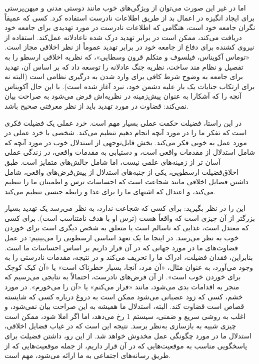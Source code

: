 اما در غیر این صورت می‌توان از ویژگی‌های خوب مانند دوستی مدنی و میهن‌پرستی برای ایجاد انگیزه در اعمال بد از طریق اطلاعات نادرست استفاده کرد.
کسی که عمیقاً نگران جامعه خود است، هنگامی که اطلاعات نادرست در مورد تهدیدی برای جامعه خود دریافت می‌کند، ممکن است در برابر تهدید درک شده ناعادلانه عمل‌کند.
استفاده از نیروی کشنده برای دفاع از جامعه خود در برابر تهدید عموماً از نظر اخلاقی مجاز است.
«توماس آکویناس، فیلسوف و متکلم قرون وسطایی»، که نظریه اخلاقی ارسطو را به تفصیل و نظام مند ساخت، نظریه جنگ عادلانه را توسعه داد که بر اساس آن، تهدید برای جامعه به وضوح شرط کافی برای وارد شدن به درگیری نظامی است (البته نه برای ارتکاب جنایات یک بار علیه دشمن خود، نبرد آغاز شده است).
با این حال آکویناس آنچه را که آشکارا به عنوان پیش‌زمینه در نظریه‌اش فرض می‌شود به صراحت بیان نمی‌کند: قضاوت در مورد تهدید باید از نظر معرفتی صحیح باشد.

در این راستا، فضیلت حکمت عملی بسیار مهم است.
خرد عملی یک فضیلت فکری است که تفکر ما را در مورد آنچه انجام دهیم تنظیم می‌کند.
شخصی با خرد عملی در مورد عمل به خوبی فکر می‌کند.
بخش قابل‌توجهی از استدلال خوب در مورد آنچه که شامل استدلال از مقدمات واقعی است، و دستیابی به مقدمات واقعی، در زندگی عملی آسان تر از زمینه‌های علمی نیست، اما شامل چالش‌های متمایز است.
طبق اخلاق‌فضیلت ارسطویی، یکی از جنبه‌های استدلال از پیش‌فرض‌های واقعی، شامل داشتن فضایل اخلاقی مانند شجاعت است که احساسات ترس و اطمینان ما را تنظیم می‌کند، و اعتدال که اشتهای ما را برای غذا و رابطه جنسی تنظیم می‌کند.

این را در نظر بگیرید: برای کسی که شجاعت ندارد، به نظر می‌رسد یک تهدید بسیار بزرگتر از آن چیزی است که واقعاً هست (ترس او با هدف نامتناسب است).
برای کسی که معتدل است، غذایی که ناسالم است یا متعلق به شخص دیگری است برای خوردن خوب به نظر می‌رسد.
در اینجا ما یک تعهد اساسی ارسطویی را می‌بینیم: در عمل قضاوت‌های ما در مورد جهانی که در آن قرار داریم بر اساس احساسات ما است.
بنابراین، فقدان فضیلت، ادراک ما را تحریف می‌کند و در نتیجه، مقدمات نادرستی را به وجود می‌آورد، به عنوان مثال، «آن مرد، آنجا، بسیار خطرناک است» یا «آن کیک کوچک برای خوردن خوب است».
از آن فرض‌های نادرست، احتمالاً به نتایجی می‌رسیم که منجر به اقدامات بدی می‌شود، مانند «فرار می‌کنم» یا «آن را می‌خورم».
در مورد خشم، کسی که زود عصبانی می‌شود ممکن است به دروغ درباره کسی که شایسته قصاص است قضاوت کند.
البته، استدلال ما همیشه به این صراحت بیان نمی‌شود، و اغلب به روشی سریع و ضمنی، سیستم 1 رخ می‌دهد، اما اگر املا شود، ممکن است چیزی شبیه به بازسازی به‌نظر برسد.
نتیجه این است که در غیاب فضایل اخلاقی، استدلال ما در مورد چگونگی عمل مخدوش خواهد شد.
از این رو، داشتن فضیلت برای پاسخگویی مناسب به موقعیت‌هایی که در آن قرار داریم، از جمله موقعیت‌هایی که از طریق رسانه‌های اجتماعی به ما ارائه می‌شود، مهم است.

